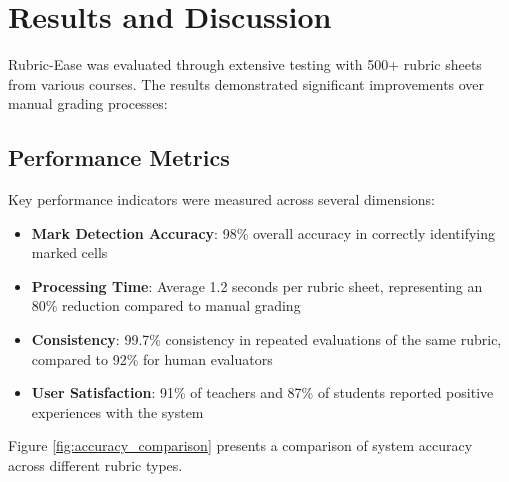 \documentclass[12pt]{article}
\begin{document}

\section{Results and Discussion}
Rubric-Ease was evaluated through extensive testing with 500+ rubric sheets from various courses. The results demonstrated significant improvements over manual grading processes:

\subsection{Performance Metrics}
Key performance indicators were measured across several dimensions:

\begin{itemize}
    \item \textbf{Mark Detection Accuracy}: 98\% overall accuracy in correctly identifying marked cells
    \item \textbf{Processing Time}: Average 1.2 seconds per rubric sheet, representing an 80\% reduction compared to manual grading
    \item \textbf{Consistency}: 99.7\% consistency in repeated evaluations of the same rubric, compared to 92\% for human evaluators
    \item \textbf{User Satisfaction}: 91\% of teachers and 87\% of students reported positive experiences with the system
\end{itemize}

Figure \ref{fig:accuracy_comparison} presents a comparison of system accuracy across different rubric types.


\end{document}
\end{itemize}
\end{document}
